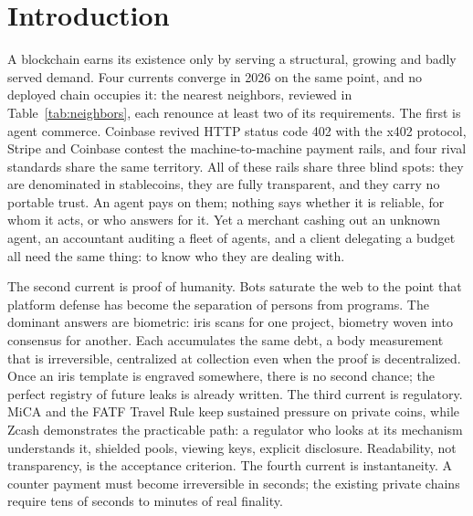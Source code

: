 
\section{Introduction}\label{sec:intro}

A blockchain earns its existence only by serving a structural, growing and
badly served demand. Four currents converge in 2026 on the same point, and
no deployed chain occupies it: the nearest neighbors, reviewed in
Table~\ref{tab:neighbors}, each renounce at least two of its requirements.
The first is agent commerce. Coinbase revived HTTP status code 402 with the
x402 protocol, Stripe and Coinbase contest the machine-to-machine payment
rails, and four rival standards share the same territory. All of these rails
share three blind spots: they are denominated in stablecoins, they are fully
transparent, and they carry no portable trust. An agent pays on them;
nothing says whether it is reliable, for whom it acts, or who answers for
it. Yet a merchant cashing out an unknown agent, an accountant auditing a
fleet of agents, and a client delegating a budget all need the same thing:
to know who they are dealing with.

The second current is proof of humanity. Bots saturate the web to the point
that platform defense has become the separation of persons from programs.
The dominant answers are biometric: iris scans for one project, biometry
woven into consensus for another. Each accumulates the same debt, a body
measurement that is irreversible, centralized at collection even when the
proof is decentralized. Once an iris template is engraved somewhere, there
is no second chance; the perfect registry of future leaks is already
written. The third current is regulatory. MiCA and the FATF Travel Rule
keep sustained pressure on private coins, while Zcash demonstrates the
practicable path: a regulator who looks at its mechanism understands it,
shielded pools, viewing keys, explicit disclosure. Readability, not
transparency, is the acceptance criterion. The fourth current is
instantaneity. A counter payment must become irreversible in seconds; the
existing private chains require tens of seconds to minutes of real
finality.

